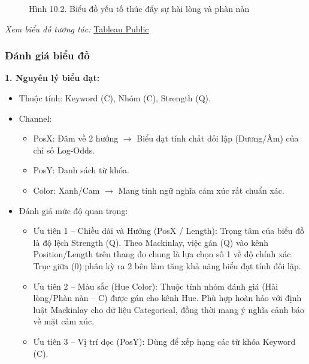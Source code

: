 \begin{figure}[H]
    \centering
    \caption{Hình 10.2. Biểu đồ yếu tố thúc đẩy sự hài lòng và phàn nàn}
    \label{fig:domain-task10-chart2}
\end{figure}

\noindent\small\textit{Xem biểu đồ tương tác: }\href{https://public.tableau.com/app/profile/duy.le4605/viz/Group10_17788537028430/Task10_2-AnalyzingExperienceCharacteristicsFactorsDrivingSatisfactionandComplaints?publish=yes}{Tableau Public}\normalsize

\subsubsection{Đánh giá biểu đồ}

\textbf{1. Nguyên lý biểu đạt:}

\begin{itemize}
    \item Thuộc tính: Keyword (C), Nhóm (C), Strength (Q).
    \item Channel:
    \begin{itemize}
        \item PosX: Đâm về 2 hướng $\rightarrow$ Biểu đạt tính chất đối lập (Dương/Âm) của chỉ số Log-Odds.
        \item PosY: Danh sách từ khóa.
        \item Color: Xanh/Cam $\rightarrow$ Mang tính ngữ nghĩa cảm xúc rất chuẩn xác.
    \end{itemize}
    \item Đánh giá mức độ quan trọng:
    \begin{itemize}
        \item Ưu tiên 1 -- Chiều dài và Hướng (PosX / Length): Trọng tâm của biểu đồ là độ lệch Strength (Q). Theo Mackinlay, việc gán (Q) vào kênh Position/Length trên thang đo chung là lựa chọn số 1 về độ chính xác. Trục giữa (0) phân kỳ ra 2 bên làm tăng khả năng biểu đạt tính đối lập.
        \item Ưu tiên 2 -- Màu sắc (Hue Color): Thuộc tính nhóm đánh giá (Hài lòng/Phàn nàn -- C) được gán cho kênh Hue. Phù hợp hoàn hảo với định luật Mackinlay cho dữ liệu Categorical, đồng thời mang ý nghĩa cảnh báo về mặt cảm xúc.
        \item Ưu tiên 3 -- Vị trí dọc (PosY): Dùng để xếp hạng các từ khóa Keyword (C).
    \end{itemize}
\end{itemize}

